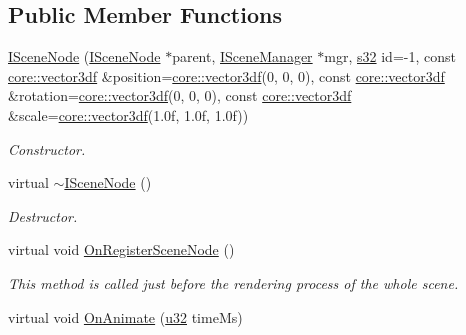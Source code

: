 \subsection*{Public Member Functions}
\begin{DoxyCompactItemize}
\item 
\mbox{\label{classirr_1_1scene_1_1ISceneNode_a9894d951df2f720924f891e0a7b9fac2}} 
\hyperlink{classirr_1_1scene_1_1ISceneNode_a9894d951df2f720924f891e0a7b9fac2}{I\+Scene\+Node} (\hyperlink{classirr_1_1scene_1_1ISceneNode}{I\+Scene\+Node} $\ast$parent, \hyperlink{classirr_1_1scene_1_1ISceneManager}{I\+Scene\+Manager} $\ast$mgr, \hyperlink{namespaceirr_ac66849b7a6ed16e30ebede579f9b47c6}{s32} id=-\/1, const \hyperlink{namespaceirr_1_1core_a06f169d08b5c429f5575acb7edbad811}{core\+::vector3df} \&position=\hyperlink{namespaceirr_1_1core_a06f169d08b5c429f5575acb7edbad811}{core\+::vector3df}(0, 0, 0), const \hyperlink{namespaceirr_1_1core_a06f169d08b5c429f5575acb7edbad811}{core\+::vector3df} \&rotation=\hyperlink{namespaceirr_1_1core_a06f169d08b5c429f5575acb7edbad811}{core\+::vector3df}(0, 0, 0), const \hyperlink{namespaceirr_1_1core_a06f169d08b5c429f5575acb7edbad811}{core\+::vector3df} \&scale=\hyperlink{namespaceirr_1_1core_a06f169d08b5c429f5575acb7edbad811}{core\+::vector3df}(1.\+0f, 1.\+0f, 1.\+0f))
\begin{DoxyCompactList}\small\item\em Constructor. \end{DoxyCompactList}\item 
\mbox{\label{classirr_1_1scene_1_1ISceneNode_a3064ed436d731f072e55873577724fbc}} 
virtual \hyperlink{classirr_1_1scene_1_1ISceneNode_a3064ed436d731f072e55873577724fbc}{$\sim$\+I\+Scene\+Node} ()
\begin{DoxyCompactList}\small\item\em Destructor. \end{DoxyCompactList}\item 
virtual void \hyperlink{classirr_1_1scene_1_1ISceneNode_ac9795bfcb88dcaf8cba6ea3296e5d8d0}{On\+Register\+Scene\+Node} ()
\begin{DoxyCompactList}\small\item\em This method is called just before the rendering process of the whole scene. \end{DoxyCompactList}\item 
virtual void \hyperlink{classirr_1_1scene_1_1ISceneNode_afc1dcb5cb19116d0c7aa3d4ebdf04cc5}{On\+Animate} (\hyperlink{namespaceirr_a0416a53257075833e7002efd0a18e804}{u32} time\+Ms)

\end{DoxyCompactItemize}
